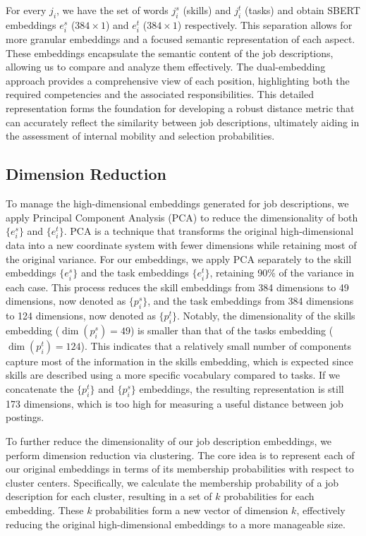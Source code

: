 \documentclass[12pt]{article}
\begin{document}
For every $j_i$, we have the set of words $j_i^s$ (skills) and $j_i^t$ (tasks) and obtain SBERT embeddings $e_i^s$ ($384 \times 1$) and $e_i^t$ ($384 \times 1$) respectively. This separation allows for more granular embeddings and a focused semantic representation of each aspect. These embeddings encapsulate the semantic content of the job descriptions, allowing us to compare and analyze them effectively. The dual-embedding approach provides a comprehensive view of each position, highlighting both the required competencies and the associated responsibilities. This detailed representation forms the foundation for developing a robust distance metric that can accurately reflect the similarity between job descriptions, ultimately aiding in the assessment of internal mobility and selection probabilities.  

\subsection{Dimension Reduction}

To manage the high-dimensional embeddings generated for job descriptions, we apply Principal Component Analysis (PCA) to reduce the dimensionality of both \(\{e_i^s\}\) and \(\{e_i^t\}\). PCA is a technique that transforms the original high-dimensional data into a new coordinate system with fewer dimensions while retaining most of the original variance. For our embeddings, we apply PCA separately to the skill embeddings \(\{e_i^s\}\) and the task embeddings \(\{e_i^t\}\), retaining 90\% of the variance in each case. This process reduces the skill embeddings from 384 dimensions to 49 dimensions, now denoted as \(\{p_i^s\}\), and the task embeddings from 384 dimensions to 124 dimensions, now denoted as \(\{p_i^t\}\). Notably, the dimensionality of the skills embedding (\(\dim(p_i^s) = 49\)) is smaller than that of the tasks embedding (\(\dim(p_i^t) = 124\)). This indicates that a relatively small number of components capture most of the information in the skills embedding, which is expected since skills are described using a more specific vocabulary compared to tasks. If we concatenate the \(\{p_i^t\}\) and \(\{p_i^s\}\) embeddings, the resulting representation is still 173 dimensions, which is too high for measuring a useful distance between job postings.


To further reduce the dimensionality of our job description embeddings, we perform dimension reduction via clustering. The core idea is to represent each of our original embeddings in terms of its membership probabilities with respect to cluster centers. Specifically, we calculate the membership probability of a job description for each cluster, resulting in a set of \(k\) probabilities for each embedding. These \(k\) probabilities form a new vector of dimension \(k\), effectively reducing the original high-dimensional embeddings to a more manageable size.
\end{document}
